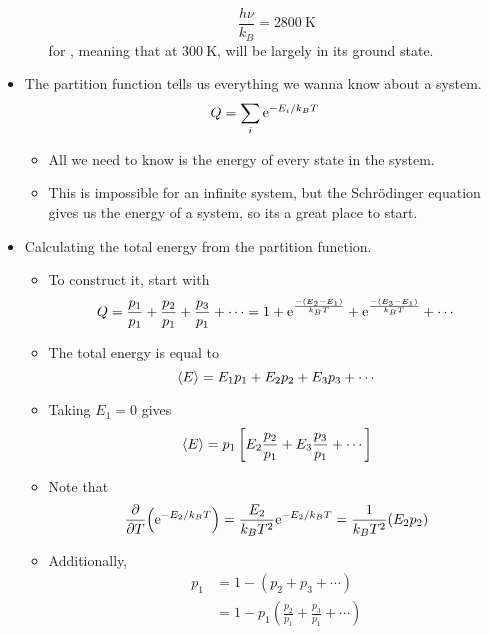 \documentclass[../notes.tex]{subfiles}
\begin{document}
\begin{itemize}
\begin{itemize}
\begin{equation*}
            \frac{h\nu}{k_B} = \SI{2800}{\kelvin}
        \end{equation*}
        for , meaning that at $\SI{300}{\kelvin}$,  will be largely in its ground state.
    \end{itemize}
    \item The partition function tells us everything we wanna know about a system.
    \begin{equation*}
        Q = \sum_i\e[-E_i/k_BT]
    \end{equation*}
    \begin{itemize}
        \item All we need to know is the energy of every state in the system.
        \item This is impossible for an infinite system, but the Schr\"{o}dinger equation gives us the energy of a system, so its a great place to start.
    \end{itemize}
    \item Calculating the total energy from the partition function.
    \begin{itemize}
        \item To construct it, start with
        \begin{equation*}
            Q = \frac{p_1}{p_1}+\frac{p_2}{p_1}+\frac{p_3}{p_1}+\cdots
            = 1+\e[\frac{-(E_2-E_1)}{k_BT}]+\e[\frac{-(E_3-E_1)}{k_BT}]+\cdots
        \end{equation*}
        \item The total energy is equal to
        \begin{equation*}
            \prb{E} = E_1p_1+E_2p_2+E_3p_3+\cdots
        \end{equation*}
        \item Taking $E_1=0$ gives
        \begin{equation*}
            \prb{E} = p_1\left[ E_2\frac{p_2}{p_1}+E_3\frac{p_3}{p_1}+\cdots \right]
        \end{equation*}
        \item Note that
        \begin{equation*}
            \pdv{T}(\e[-E_2/k_BT]) = \frac{E_2}{k_BT^2}\e[-E_2/k_BT]
            = \frac{1}{k_BT^2}(E_2p_2)
        \end{equation*}
        \item Additionally,
        \begin{align*}
            p_1 &= 1-(p_2+p_3+\cdots)\\
            &= 1-p_1\left( \frac{p_2}{p_1}+\frac{p_3}{p_1}+\cdots \right)\\

\end{align*}
\end{itemize}
\end{itemize}
\end{document}
